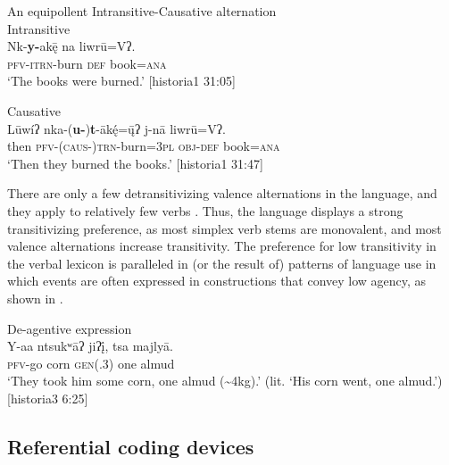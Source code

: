 \documentclass[output=paper]{../langscibook}
\begin{document}
\ea\label{ex:campbell:17}
{An equipollent Intransitive-Causative alternation}\\
\ea
\label{ex:campbell:17a}
{ Intransitive}\\
\gll Nk-\textbf{y-}ak\={ę}  na  liwrū=Vʔ.\\
     \textsc{pfv}{}-\textsc{itrn}{}-burn  \textsc{def}  book=\textsc{ana}\\
\glt ‘The books were burned.’ [historia1 31:05]


\ex\label{ex:campbell:17b}
{  Causative}\\
\gll Lūwíʔ  nka-(\textbf{u-})\textbf{t}{}-āk\'{ę}=\={\k{u}}ʔ  j-nā  liwrū=Vʔ.\\
     then  \textsc{pfv-(caus}{}-)\textsc{trn}{}-burn=\textsc{3pl}  \textsc{obj}{}-\textsc{def}  book=\textsc{ana}\\
\glt ‘Then they burned the books.’ [historia1 31:47]
\z
\z


There are only a few detransitivizing valence alternations in the language, and they apply to relatively few verbs \citep{Campbell2015}. Thus, the language displays a strong transitivizing preference, as most simplex verb stems are monovalent, and most valence alternations increase transitivity. The preference for low transitivity in the verbal lexicon is paralleled in (or the result of) patterns of language use in which events are often expressed in constructions that convey low agency, as shown in .


\ea\label{ex:campbell:18}
{De-agentive expression}\\
\gll Y-aa  ntsukʷāʔ  jiʔį̄,  tsa  majlyā.\\
     \textsc{pfv}{}-go  corn  \textsc{gen(.3)}  one  almud\\
\glt ‘They took him some corn, one almud ({\textasciitilde}4kg).’ (lit. ‘His corn went, one almud.’) [historia3 6:25]
\z

\subsection{Referential coding devices}
\label{sec:campbell:3.3}
\end{document}

